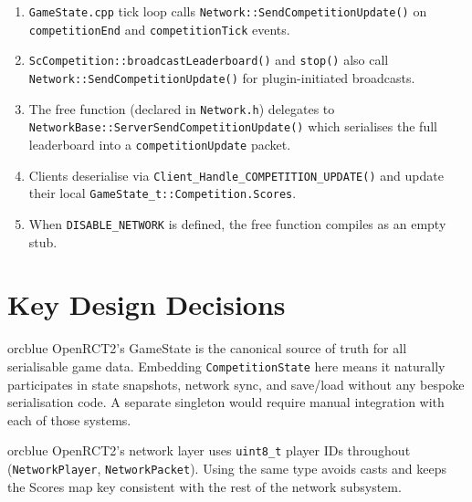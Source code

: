\documentclass[12pt,a4paper]{article}
\begin{document}
\begin{enumerate}[noitemsep]
  \item \texttt{GameState.cpp} tick loop calls \texttt{Network::SendCompetitionUpdate()} on
        \texttt{competitionEnd} and \texttt{competitionTick} events.
  \item \texttt{ScCompetition::broadcastLeaderboard()} and \texttt{stop()} also call
        \texttt{Network::SendCompetitionUpdate()} for plugin-initiated broadcasts.
  \item The free function (declared in \texttt{Network.h}) delegates to
        \texttt{NetworkBase::ServerSendCompetitionUpdate()} which serialises the full leaderboard
        into a \texttt{competitionUpdate} packet.
  \item Clients deserialise via \texttt{Client\_Handle\_COMPETITION\_UPDATE()} and update their
        local \texttt{GameState\_t::Competition.Scores}.
  \item When \texttt{DISABLE\_NETWORK} is defined, the free function compiles as an empty stub.
\end{enumerate}

\section{Key Design Decisions}

\begin{calloutbox}[title={Why embed in GameState\_t rather than a separate registry?}]{orcblue}
OpenRCT2's GameState is the canonical source of truth for all serialisable game data. Embedding
\texttt{CompetitionState} here means it naturally participates in state snapshots, network sync,
and save/load without any bespoke serialisation code. A separate singleton would require manual
integration with each of those systems.
\end{calloutbox}

\vspace{0.5em}

\begin{calloutbox}[title={Why \texttt{uint8\_t} for player IDs?}]{orcblue}
OpenRCT2's network layer uses \texttt{uint8\_t} player IDs throughout
(\texttt{NetworkPlayer}, \texttt{NetworkPacket}). Using the same type avoids casts and keeps the
Scores map key consistent with the rest of the network subsystem.
\end{calloutbox}

\vspace{0.5em}
\end{document}
